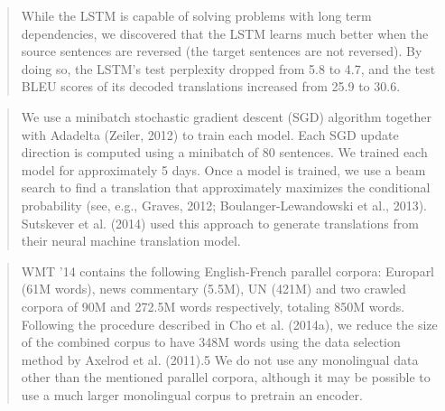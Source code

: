 \documentclass{beamer}
\begin{document}
\begin{frame}
  \begin{quote}
    While the LSTM is capable of solving problems with long term
    dependencies, we discovered that the LSTM learns much better when
    the source sentences are reversed (the target sentences are not
    reversed). By doing so, the LSTM’s test perplexity dropped from
    5.8 to 4.7, and the test BLEU scores of its decoded translations
    increased from 25.9 to 30.6.
  \end{quote}
\end{frame}

 




\begin{frame}
  \begin{quote}
    We use a minibatch stochastic gradient descent (SGD) algorithm
    together with Adadelta (Zeiler, 2012) to train each model. Each
    SGD update direction is computed using a minibatch of 80
    sentences.  We trained each model for approximately 5 days.  Once
    a model is trained, we use a beam search to find a translation
    that approximately maximizes the conditional probability (see,
    e.g., Graves, 2012; Boulanger-Lewandowski et al., 2013). Sutskever
    et al. (2014) used this approach to generate translations from
    their neural machine translation model.
  \end{quote}
\end{frame}


\begin{frame}
  \begin{quote}
    WMT ’14 contains the following English-French parallel corpora: Europarl (61M words), news
commentary (5.5M), UN (421M) and two crawled corpora of 90M and 272.5M words respectively,
totaling 850M words. Following the procedure described in Cho et al. (2014a), we reduce the size of
the combined corpus to have 348M words using the data selection method by Axelrod et al. (2011).5
We do not use any monolingual data other than the mentioned parallel corpora, although it may be
possible to use a much larger monolingual corpus to pretrain an encoder.
  \end{quote}
\end{frame}
\end{document}
